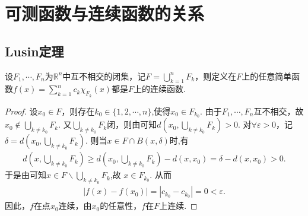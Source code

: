 \documentclass[../../main.tex]{subfiles}%
\begin{document}
\section{可测函数与连续函数的关系}

\subsection{Lusin定理}

\begin{lemma}\label{lemma:简单函数在无交闭集连续则在这些闭集的并上也连续}
设\(F_1, \cdots, F_n\)为\(\mathbb{R}^n\)中互不相交的闭集，记\(F = \bigcup_{k = 1}^{n} F_k\)，则定义在$F$上的任意简单函数\(f(x) = \sum_{k = 1}^{n} c_k \chi_{F_k}(x)\)都是\(F\)上的连续函数.
\end{lemma}
\begin{proof}

设\(x_0 \in F\)，则存在\(k_0\in \{1,2,\cdots,n\}\),使得\(x_0 \in F_{k_0}\). 由于\(F_1, \cdots, F_n\)互不相交，故\(x_0 \notin \bigcup_{k \neq k_0} F_k\). 又\(\bigcup_{k \neq k_0} F_k\)闭，则由可知\(d(x_0, \bigcup_{k \neq k_0} F_k) > 0\). 对\(\forall \varepsilon > 0\)，记\(\delta = d(x_0, \bigcup_{k \neq k_0} F_k)\). 则当\(x \in F\cap B(x,\delta)\)时,有
\begin{align*}
d\left( x,\bigcup_{k\ne k_0}{F_k} \right) \geqslant d\left( x_0,\bigcup_{k\ne k_0}{F_k} \right) -d\left( x,x_0 \right) =\delta -d\left( x,x_0 \right) >0.
\end{align*}
于是由可知$x\in F\backslash \bigcup_{k\ne k_0}{F_k}$,故
\(x \in F_{k_0}\). 从而
\begin{align*}
|f(x) - f(x_0)| = |c_{k_0} - c_{k_0}| = 0 < \varepsilon.
\end{align*}
因此，\(f\)在点\(x_0\)连续，由\(x_0\)的任意性，\(f\)在\(F\)上连续. 

\end{proof}
\end{document}
